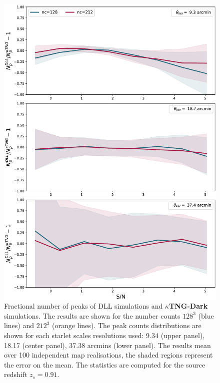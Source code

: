 \documentclass{aa}
\begin{document}
\begin{appendix}
\renewcommand{\thefigure}{C\arabic{figure}}
\setcounter{figure}{1}
\begin{figure}\label{peaks_high}
    \centering
    \includegraphics[width=\columnwidth]{paper/figures/res_peak_DLL_vs_ktng_high.pdf}
    \caption{Fractional number of peaks of DLL simulations and \textbf{$\kappa$TNG-Dark} simulations. The results are shown for the number counts $128^3$ (blue lines) and $212^3$ (orange lines). The peak counts distributions are shown for each starlet scales resolutions used: 9.34 (upper panel), 18.17 (center panel), 37.38 arcmins (lower panel).
  The results mean over 100 independent map realisations, the shaded regions represent the error on the mean. The statistics are computed for the source redshift $z_s=0.91$. }
\end{figure}


\end{appendix}
\end{document}
